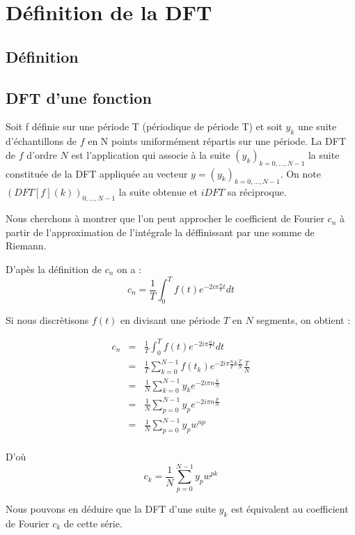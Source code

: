 \documentclass[a4paper,12pt]{report}
\begin{document}
\newpage
\null
\newpage
\tableofcontents


\chapter{Définition de la DFT}

	\section{D\'efinition}

	\section{DFT d'une fonction}

	Soit f d\'efinie sur une p\'eriode T (p\'eriodique de p\'eriode T) et soit $y_{k}$ une suite d'\'echantillons de $f$ en N points uniform\'ement r\'epartis sur une p\'eriode. La DFT de $f$ d'ordre $N$ est l'application qui associe \`a la suite $(y_{k})_{k=0,...,N-1}$ la suite constitu\'ee de la DFT appliqu\'ee au vecteur $y = (y_{k})_{k=0,...,N-1}$. On note $(DFT[f](k))_{0,...,N-1}$ la suite obtenue et $iDFT$ sa r\'eciproque.

	Nous cherchons à montrer que l'on peut approcher le coefficient de Fourier $c_{n}$ \`a partir de l'approximation de l'int\'egrale la d\'effinissant par une somme de Riemann.

	D'ap\`es la d\'efinition de $c_{n}$ on a : \[c_{n}=\frac{1}{T}\int_{0}^{T}f(t)e^{-2i\pi \frac{n}{T}t}dt\]

	Si nous discr\`etisons $f(t)$ en divisant une p\'eriode $T$ en $N$ segments, on obtient :

	\begin{eqnarray*}
		c_{n}&=&\frac{1}{T}\int_{0}^{T}f(t)e^{-2i\pi \frac{n}{T}t}dt\\
		&=&\frac{1}{T}\sum_{k=0}^{N-1}f(t_{k})e^{-2i\pi \frac{n}{T}k\frac{T}{N}}\frac{T}{N}\\
		&=&\frac{1}{N}\sum_{k=0}^{N-1}y_{k}e^{-2i\pi n\frac{k}{N}}\\
		&=&\frac{1}{N}\sum_{p=0}^{N-1}y_{p}e^{-2i\pi n\frac{p}{N}}\\
		&=&\frac{1}{N}\sum_{p=0}^{N-1}y_{p}w^{np}\\
	\end{eqnarray*}

	D'o\`u \[c_{k}=\frac{1}{N}\sum_{p=0}^{N-1}y_{p}w^{pk}\]

	Nous pouvons en d\'eduire que la DFT d'une suite $y_{k}$ est \'equivalent au coefficient de Fourier $c_{k}$ de cette s\'erie.
	
\end{document}
